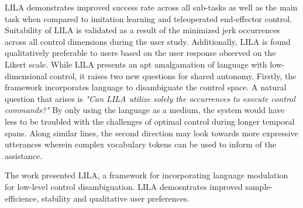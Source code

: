 \documentclass[12pt,letterpaper]{article}
\begin{document}
LILA demonstrates improved success rate across all sub-tasks as well as the main task when compared to imitation learning and teleoperated end-effector control. Suitability of LILA is validated as a result of the minimized jerk occurrences across all control dimensions during the user study. Additionally, LILA is found qualitatively preferable to users based on the user response observed on the Likert scale. While LILA presents an apt amalgamation of language with low-dimensional control, it raises two new questions for shared autonomy. Firstly, the framework incorporates language to disambiguate the control space. A natural question that arises is \textit{"Can LILA utilize solely the occurrences to execute control commands?"} By only using the language as a medium, the system would have less to be troubled with the challenges of optimal control during longer temporal spans. Along similar lines, the second direction may look towards more expressive utterances wherein complex vocabulary tokens can be used to inform of the assistance.

The work presented LILA, a framework for incorporating language modulation for low-level control disambiguation. LILA demosntrates improved sample-efficience, stability and qualitative user preferences.
\end{document}
